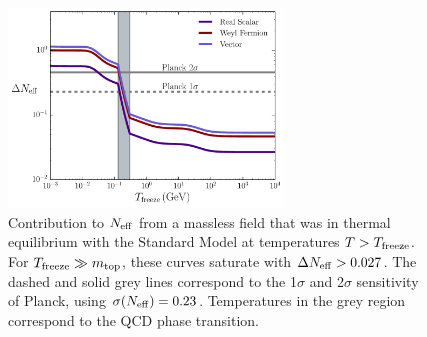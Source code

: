 \begin{figure}[t!]
\begin{center}
\includegraphics[width=0.65\textwidth]{Neutrinos/Neff.pdf}
\caption{Contribution to $N_{\rm eff}$ from a massless field that was in thermal equilibrium with the Standard Model at temperatures $T> T_{\rm freeze}$.  For $T_{\rm freeze} \gg m_{\rm top}$, these curves saturate with $\Delta N_{\rm eff} > 0.027$.   The dashed and solid grey lines correspond to the 1$\sigma$ and 2$\sigma$ sensitivity of Planck, using $\sigma(N_{\rm eff}) = 0.23$. Temperatures in the grey region correspond to the QCD phase transition.}
\label{fig:Neff_thermal}
\end{center}
\end{figure} 

